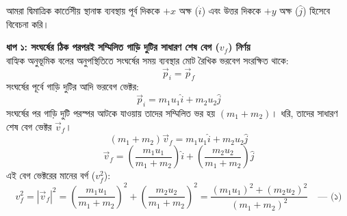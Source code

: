 \documentclass[12pt, a4paper]{article}
\begin{document}
\begin{tcolorbox}[solutionbox={সমাধান (Solution)}]
\noindent
আমরা দ্বিমাত্রিক কার্তেসীয় স্থানাঙ্ক ব্যবস্থায় পূর্ব দিককে $+x$ অক্ষ ($\hat{i}$) এবং উত্তর দিককে $+y$ অক্ষ ($\hat{j}$) হিসেবে বিবেচনা করি।

\vspace{0.5em}
\noindent
\textbf{ধাপ ১: সংঘর্ষের ঠিক পরপরই সম্মিলিত গাড়ি দুটির সাধারণ শেষ বেগ ($v_f$) নির্ণয়} \\
বাহ্যিক অনুভূমিক বলের অনুপস্থিতিতে সংঘর্ষের সময় ব্যবস্থার মোট রৈখিক ভরবেগ সংরক্ষিত থাকে:
\[ \vec{p}_i = \vec{p}_f \]
সংঘর্ষের পূর্বে গাড়ি দুটির আদি ভরবেগ ভেক্টর:
\[ \vec{p}_i = m_1 u_1 \hat{i} + m_2 u_2 \hat{j} \]
সংঘর্ষের পর গাড়ি দুটি পরস্পর আটকে যাওয়ায় তাদের সম্মিলিত ভর হয় $(m_1 + m_2)$। ধরি, তাদের সাধারণ শেষ বেগ ভেক্টর $\vec{v}_f$।
\[ (m_1 + m_2)\vec{v}_f = m_1 u_1 \hat{i} + m_2 u_2 \hat{j} \]
\[ \vec{v}_f = \left( \frac{m_1 u_1}{m_1 + m_2} \right)\hat{i} + \left( \frac{m_2 u_2}{m_1 + m_2} \right)\hat{j} \]
এই বেগ ভেক্টরের মানের বর্গ ($v_f^2$):
\[ v_f^2 = |\vec{v}_f|^2 = \left( \frac{m_1 u_1}{m_1 + m_2} \right)^2 + \left( \frac{m_2 u_2}{m_1 + m_2} \right)^2 = \frac{(m_1 u_1)^2 + (m_2 u_2)^2}{(m_1 + m_2)^2} \quad \text{--- (১)} \]

\vspace{1em}
\begin{center}
\end{center}
\end{tcolorbox}
\end{document}
